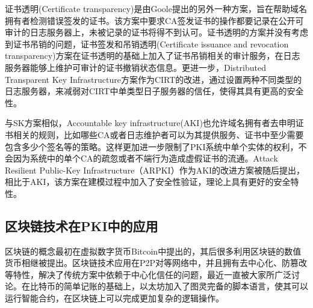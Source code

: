 证书透明(Certificate transparency)\supercite{laurie2013certificate}是由Goole提出的另外一种方案，旨在帮助域名拥有者检测错误签发的证书。该方案中要求CA签发证书的操作都要记录在公开可审计的日志服务器上，未被记录的证书将得不到认可。证书透明的方案并没有考虑到证书吊销的问题，证书签发和吊销透明(Certificate issuance and revocation transparency)\supercite{ryan2014enhanced}方案在证书透明的基础上加入了证书吊销相关的审计服务，在日志服务器能够上维护可审计的证书撤销状态信息。更进一步，Distributed Transparent Key Infrastructure\supercite{cheval2014dtki}方案作为CIRT的改进，通过设置两种不同类型的日志服务器，来减弱对CIRT中单类型日子服务器的信任，使得其具有更高的安全性。


与SK方案相似，Accountable key infrastructure(AKI)\supercite{kim2013accountable}也允许域名拥有者去申明证书相关的规则，比如哪些CA或者日志维护者可以为其提供服务、证书中至少需要包含多少个签名等的策略。这样更加进一步限制了PKI系统中单个实体的权利，不会因为系统中的单个CA的疏忽或者不端行为造成虚假证书的流通。Attack Resilient Public-Key Infrastructure（ARPKI）\supercite{basin2014arpki}作为AKI的改进方案被随后提出，相比于AKI，该方案在建模过程中加入了安全性验证，理论上具有更好的安全特性。

%

\subsection{区块链技术在PKI中的应用}

区块链的概念最初在虚拟数字货币Bitcoin中提出的\supercite{nakamoto2008bitcoin}，其后很多利用区块链的数值货币相继被提出。区块链技术应用在P2P对等网络中，并且拥有去中心化、防篡改等特性，解决了传统方案中依赖于中心化信任的问题，最近一直被大家所广泛讨论。在比特币的简单记账的基础上，以太坊\supercite{buterin2013ethereum}加入了图灵完备的脚本语言，使其可以运行智能合约，在区块链上可以完成更加复杂的逻辑操作。



